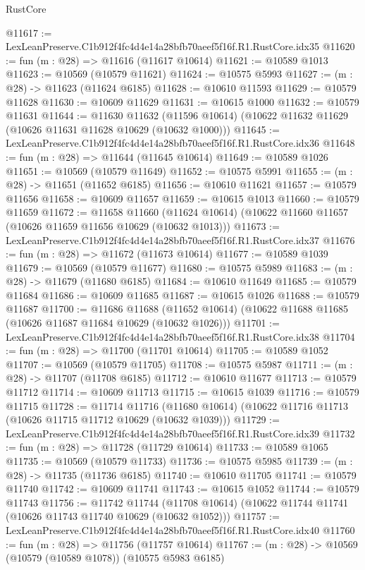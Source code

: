 \begin{lexlean}{RustCore}
\begin{coremodule}
@11617 := LexLeanPreserve.C1b912f4fc4d4e14a28bfb70aeef5f16f.R1.RustCore.idx35
@11620 := fun (m : @28) => @11616 (@11617 @10614)
@11621 := @10589 @1013
@11623 := @10569 (@10579 @11621)
@11624 := @10575 @5993
@11627 := (m : @28) -> @11623 (@11624 @6185)
@11628 := @10610 @11593
@11629 := @10579 @11628
@11630 := @10609 @11629
@11631 := @10615 @1000
@11632 := @10579 @11631
@11644 := @11630
    @11632
    (@11596 @10614)
    (@10622 @11632 @11629 (@10626 @11631 @11628 @10629 (@10632 @1000)))
@11645 := LexLeanPreserve.C1b912f4fc4d4e14a28bfb70aeef5f16f.R1.RustCore.idx36
@11648 := fun (m : @28) => @11644 (@11645 @10614)
@11649 := @10589 @1026
@11651 := @10569 (@10579 @11649)
@11652 := @10575 @5991
@11655 := (m : @28) -> @11651 (@11652 @6185)
@11656 := @10610 @11621
@11657 := @10579 @11656
@11658 := @10609 @11657
@11659 := @10615 @1013
@11660 := @10579 @11659
@11672 := @11658
    @11660
    (@11624 @10614)
    (@10622 @11660 @11657 (@10626 @11659 @11656 @10629 (@10632 @1013)))
@11673 := LexLeanPreserve.C1b912f4fc4d4e14a28bfb70aeef5f16f.R1.RustCore.idx37
@11676 := fun (m : @28) => @11672 (@11673 @10614)
@11677 := @10589 @1039
@11679 := @10569 (@10579 @11677)
@11680 := @10575 @5989
@11683 := (m : @28) -> @11679 (@11680 @6185)
@11684 := @10610 @11649
@11685 := @10579 @11684
@11686 := @10609 @11685
@11687 := @10615 @1026
@11688 := @10579 @11687
@11700 := @11686
    @11688
    (@11652 @10614)
    (@10622 @11688 @11685 (@10626 @11687 @11684 @10629 (@10632 @1026)))
@11701 := LexLeanPreserve.C1b912f4fc4d4e14a28bfb70aeef5f16f.R1.RustCore.idx38
@11704 := fun (m : @28) => @11700 (@11701 @10614)
@11705 := @10589 @1052
@11707 := @10569 (@10579 @11705)
@11708 := @10575 @5987
@11711 := (m : @28) -> @11707 (@11708 @6185)
@11712 := @10610 @11677
@11713 := @10579 @11712
@11714 := @10609 @11713
@11715 := @10615 @1039
@11716 := @10579 @11715
@11728 := @11714
    @11716
    (@11680 @10614)
    (@10622 @11716 @11713 (@10626 @11715 @11712 @10629 (@10632 @1039)))
@11729 := LexLeanPreserve.C1b912f4fc4d4e14a28bfb70aeef5f16f.R1.RustCore.idx39
@11732 := fun (m : @28) => @11728 (@11729 @10614)
@11733 := @10589 @1065
@11735 := @10569 (@10579 @11733)
@11736 := @10575 @5985
@11739 := (m : @28) -> @11735 (@11736 @6185)
@11740 := @10610 @11705
@11741 := @10579 @11740
@11742 := @10609 @11741
@11743 := @10615 @1052
@11744 := @10579 @11743
@11756 := @11742
    @11744
    (@11708 @10614)
    (@10622 @11744 @11741 (@10626 @11743 @11740 @10629 (@10632 @1052)))
@11757 := LexLeanPreserve.C1b912f4fc4d4e14a28bfb70aeef5f16f.R1.RustCore.idx40
@11760 := fun (m : @28) => @11756 (@11757 @10614)
@11767 := (m : @28) -> @10569 (@10579 (@10589 @1078)) (@10575 @5983 @6185)

\end{coremodule}
\end{lexlean}
